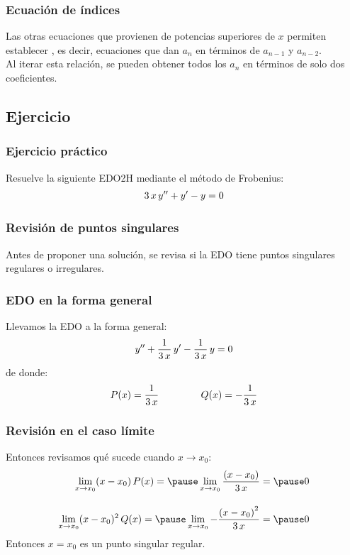 \documentclass[12pt]{beamer}
\begin{document}
\begin{frame}
\frametitle{Ecuación de índices}
Las otras ecuaciones que provienen de potencias superiores de $x$ permiten establecer , es decir, ecuaciones que dan $a_{n}$ en términos de $a_{n-1}$ y $a_{n-2}$.
\\
\bigskip
\pause
Al iterar esta relación, se pueden obtener todos los $a_{n}$ en términos de solo dos coeficientes.
\end{frame}

\subsection{Ejercicio}

\begin{frame}
\frametitle{Ejercicio práctico}
Resuelve la siguiente EDO2H mediante el método de Frobenius:
\pause
\begin{align}
3 \, x \, {y}^{\prime \prime} + {y}^{\prime} - y = 0
\label{eq:ecuacion_04}    
\end{align}
\end{frame}
\begin{frame}
\frametitle{Revisión de puntos singulares}
Antes de proponer una solución, se revisa si la EDO tiene puntos singulares regulares o irregulares.
\end{frame}
\begin{frame}
\frametitle{EDO en la forma general}
Llevamos la EDO a la forma general:
\begin{align*}
    {y}^{\prime \prime} + \dfrac{1}{3 \, x} \, {y}^{\prime} - \dfrac{1}{3 \, x} \, y = 0
\end{align*}
\pause
de donde:
\pause
\begin{align*}
    P (x) = \dfrac{1}{3 \, x} \hspace{1.5cm} Q (x) = -\dfrac{1}{3 \, x}
\end{align*}
\end{frame}
\begin{frame}
\frametitle{Revisión en el caso límite}
Entonces revisamos qué sucede cuando $x \to x_{0}$:
\pause
\begin{eqnarray*}
    \lim_{x \to x_{0}} (x - x_{0}) \, P (x) = \pause \lim_{x \to x_{0}} \dfrac{ \left( x - x_{0} \right)}{3 \, x} = \pause 0 \\[1em]
    \lim_{x \to x_{0}} (x - x_{0})^{2} \, Q (x) = \pause \lim_{x \to x_{0}} - \dfrac{\left( x - x_{0} \right)^{2}}{3 \, x} = \pause 0 
\end{eqnarray*}
\pause
Entonces $x = x_{0}$ es un punto singular regular.
\end{frame}
\end{document}
